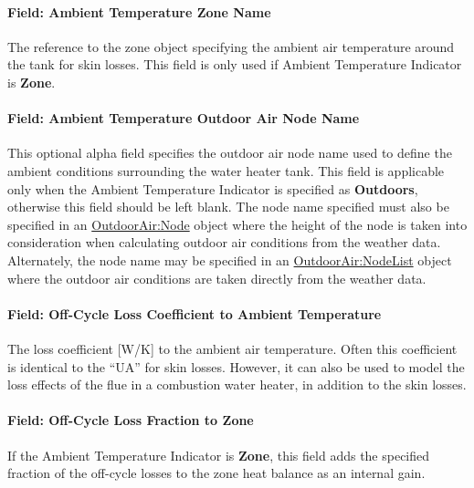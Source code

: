 \paragraph{Field: Ambient Temperature Zone Name}\label{field-ambient-temperature-zone-name-001}

The reference to the zone object specifying the ambient air temperature around the tank for skin losses. This field is only used if Ambient Temperature Indicator is \textbf{Zone}.

\paragraph{Field: Ambient Temperature Outdoor Air Node Name}\label{field-ambient-temperature-outdoor-air-node-name-000}

This optional alpha field specifies the outdoor air node name used to define the ambient conditions surrounding the water heater tank. This field is applicable only when the Ambient Temperature Indicator is specified as \textbf{Outdoors}, otherwise this field should be left blank. The node name specified must also be specified in an \hyperref[outdoorairnode]{OutdoorAir:Node} object where the height of the node is taken into consideration when calculating outdoor air conditions from the weather data. Alternately, the node name may be specified in an \hyperref[outdoorairnodelist]{OutdoorAir:NodeList} object where the outdoor air conditions are taken directly from the weather data.

\paragraph{Field: Off-Cycle Loss Coefficient to Ambient Temperature}\label{field-off-cycle-loss-coefficient-to-ambient-temperature}

The loss coefficient {[}W/K{]} to the ambient air temperature. Often this coefficient is identical to the ``UA'' for skin losses. However, it can also be used to model the loss effects of the flue in a combustion water heater, in addition to the skin losses.

\paragraph{Field: Off-Cycle Loss Fraction to Zone}\label{field-off-cycle-loss-fraction-to-zone}

If the Ambient Temperature Indicator is \textbf{Zone}, this field adds the specified fraction of the off-cycle losses to the zone heat balance as an internal gain.

